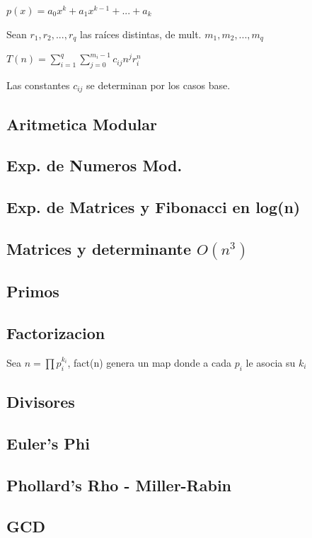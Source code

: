 {$p(x)=a_0 x^k + a_1 x^{k-1} + ... + a_k$

Sean $r_1,r_2,...,r_q$ las raíces distintas, de mult. $m_1, m_2, ..., m_q$

$T(n)=\sum_{i=1}^q{\sum_{j=0}^{m_i - 1}c_{ij} n^j r_i^n}$

Las constantes $c_{ij}$ se determinan por los casos base.
\subsection{Aritmetica Modular}
\subsection{Exp. de Numeros Mod.}
\subsection{Exp. de Matrices y Fibonacci en log(n)}
\subsection{Matrices y determinante $O(n^3)$}
\subsection{Primos}
\subsection{Factorizacion}
Sea $n=\prod{p_i^{k_i}}$, fact(n) genera un map donde a cada $p_i$ le asocia su $k_i$
\subsection{Divisores}
\subsection{Euler's Phi}
\subsection{Phollard's Rho - Miller-Rabin}
\subsection{GCD}
}
